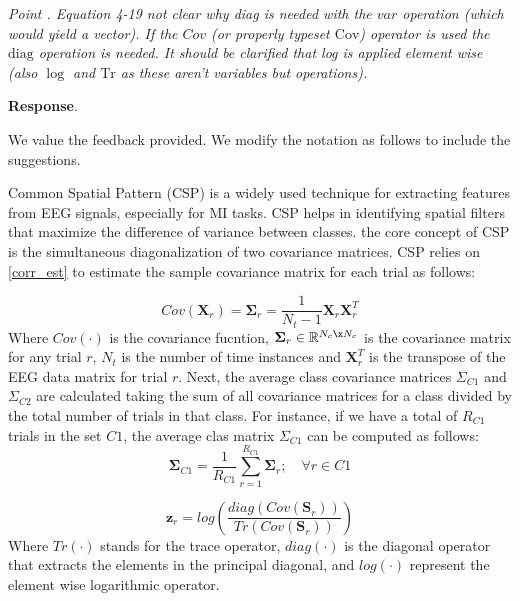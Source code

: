 \documentclass[runningheads]{llncs}
\newcommand{\Real}{\mathbb{R}}
\newcommand{\Tr}[1]{Tr \left( #1 \right)}
\newcommand{\diag}[1]{diag \left( #1 \right)}
\newcommand{\ve}[1]{\bm {#1}}
\newcommand{\mat}[1]{\bm {#1}}
\newenvironment{reviewer}{\setcounter{pointcounter}{1}}{}
\newcommand{\changes}[1]{\textcolor[rgb]{1.00,0.00,0.00}{#1}}
\newcommand{\point}[1]{\medskip \noindent
 \textsl{{\fontseries{b}\selectfont Point \thepointcounter}.
 \stepcounter{pointcounter} #1}}
\newcommand{\reply}{\medskip \noindent \textbf{Response}.\ }
\begin{document}
\begin{reviewer}
{}

\point{Equation 4-19 not clear why diag is needed with the $var$ operation (which would yield a vector). If the $Cov$ (or properly typeset $\mathrm{Cov}$) operator is used the $\mathrm{diag}$ operation is needed.   It should be clarified that log is applied element wise (also $\log$ and $\mathrm{Tr}$ as these aren't variables but operations). }

\reply{
    We value the feedback provided. We modify the notation as follows to include the suggestions.

    \changes{
    Common Spatial Pattern (CSP) is a widely used technique for extracting features from EEG signals, especially for MI tasks. CSP helps in identifying spatial filters that maximize the difference of variance between classes. the core concept of CSP is the simultaneous diagonalization of two covariance matrices. CSP relies on \cref{corr_est} to estimate the sample covariance matrix for each trial as follows:}
    
    \changes{
    \begin{equation}
        Cov(\mat{X}_r) = \mat{\Sigma}_{r} = \frac{1}{N_{t}-1} \mat{X}_r \mat{X}_{r}^T
    \end{equation}
    }
    \changes{
    Where $Cov(\cdot)$ is the covariance fucntion, $\mat{\Sigma}_{r} \in \Real^{N_c \x N_c}$ is the covariance matrix for any trial $r$, $N_{t}$ is the number of time instances and $\mat{X}_{r}^{T}$ is the transpose of the EEG data matrix for trial $r$.
    }
    \changes{
    Next, the average class covariance matrices $\Sigma_{C1}$ and $\Sigma_{C2}$ are calculated taking the sum of all covariance matrices for a class  divided by the total number of trials in that class. For instance, if we have a total of $R_{C1}$ trials in the set $C1$, the average clas matrix $\Sigma_{C1}$ can be computed as follows:
    }
    \changes{
    \begin{equation}
    \mat{\Sigma}_{C1} = \frac{1}{R_{C1}} \sum_{{r}=1}^{R_{C1}} \mat{\Sigma}_{r};\quad \forall r \in C1     
    \end{equation}
    }


    \changes{
    \begin{equation}\label{eq:CSPfeats}
    \ve{z}_r = log \left( \frac{\diag{Cov({\mat{S}}_{r})}}{\Tr{Cov(\mat{S}_{r})}}  \right)  
    \end{equation}
    }
    \changes{
    Where $\Tr{\cdot}$ stands for the trace operator, $\diag{\cdot}$ is the diagonal operator that extracts the elements in the principal diagonal, and $log(\cdot)$ represent the element wise logarithmic operator}.
}


\end{reviewer}
\end{document}
